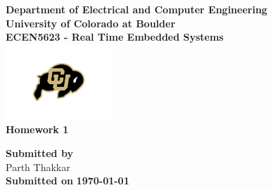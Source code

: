 \begin{titlepage}
\center %

\textbf{\large Department of Electrical and Computer Engineering}\\[0.5cm]
\textbf{\Large University of Colorado at Boulder}\\[1cm]
\textbf{\large ECEN5623 - Real Time Embedded Systems }\\[2cm]
\includegraphics[width=0.3\textwidth]{figures/cu}\\[2cm]

	
\textbf{\Huge Homework 1 }\\[0.2cm]





\vfill

\textbf{\large Submitted by}\\[0.5cm]

{\large Parth Thakkar}\\[0.5cm]	


\textbf{\large Submitted on}
\textbf{\Large \today} %


\vfill %

\end{titlepage}